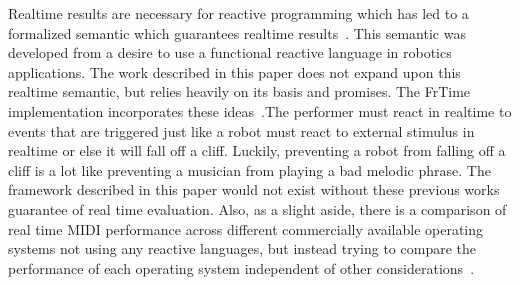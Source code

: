 \documentclass[12pt]{ucthesis}
\begin{document}
Realtime results are necessary for reactive programming which has led to a formalized semantic which guarantees realtime results~\cite{EventDriven}\cite{RealTime}. This semantic was developed from a desire to use a functional reactive language in robotics applications. The work described in this paper does not expand upon this realtime semantic, but relies heavily on its basis and promises. The FrTime implementation incorporates these ideas~\cite{FrTime}.The performer must react in realtime to events that are triggered just like a robot must react to external stimulus in realtime or else it will fall off a cliff. Luckily, preventing a robot from falling off a cliff is a lot like preventing a musician from playing a bad melodic phrase. The framework described in this paper would not exist without these previous works guarantee of real time evaluation. Also, as a slight aside, there is a comparison of real time MIDI performance across different commercially available operating systems not using any reactive languages, but instead trying to compare the performance of each operating system independent of other considerations~\cite{real-time-midi}.
\end{document}
